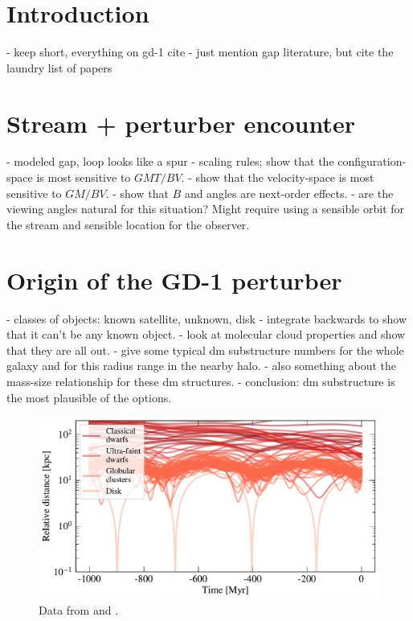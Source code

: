 \documentclass[12pt, modern]{aastex62}
\begin{document}

\section{Introduction}
\label{sec:intro}
- keep short, everything on gd-1 cite
- just mention gap literature, but cite the laundry list of papers

\section{Stream + perturber encounter}
\label{sec:model}
- modeled gap, loop looks like a spur
- scaling rules; show that the configuration-space is most sensitive to $GMT/BV$.
- show that the velocity-space is most sensitive to $GM/BV$.
- show that $B$ and angles are next-order effects.
- are the viewing angles natural for this situation? Might require using a sensible
orbit for the stream and sensible location for the observer.

\section{Origin of the GD-1 perturber}
\label{sec:origin}
- classes of objects: known satellite, unknown, disk
- integrate backwards to show that it can't be any known object.
- look at molecular cloud properties and show that they are all out.
- give some typical dm substructure numbers for the whole galaxy and for this radius range in the nearby halo.
- also something about the mass-size relationship for these dm structures.
- conclusion: dm substructure is the most plausible of the options.

\begin{figure}
\begin{center}
\includegraphics[width=\textwidth]{satellite_distances.pdf}
\end{center}
\caption{Data from \citet{simon2018} and \citet{gdr2_satellites}.}
\label{fig:known_encounters}
\end{figure}
\end{document}
